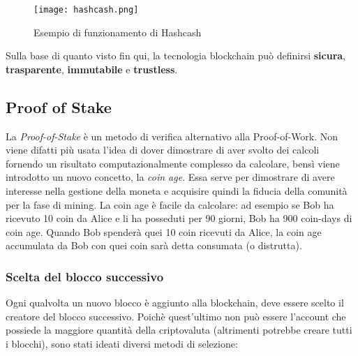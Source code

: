 \begin{figure}[htbp]
  \centering
  \texttt{[image: hashcash.png]}
  \caption{Esempio di funzionamento di Hashcash}
  \label{fig:hashcash}
\end{figure}

Sulla base di quanto visto fin qui, la tecnologia blockchain può definirsi \textbf{sicura}, \textbf{trasparente}, \textbf{immutabile} e \textbf{trustless}.

\subsection{Proof of Stake}
La \textit{Proof-of-Stake} è un metodo di verifica alternativo alla Proof-of-Work. Non viene difatti più usata l'idea di dover dimostrare di aver svolto dei calcoli fornendo un risultato computazionalmente complesso da calcolare, bensì viene introdotto un nuovo concetto, la \textit{coin age}. Essa serve per dimostrare di avere interesse nella gestione della moneta e acquisire quindi la fiducia della comunità per la fase di mining. La coin age è facile da calcolare: ad esempio se Bob ha ricevuto 10 coin da Alice e li ha posseduti per 90 giorni, Bob ha 900 coin-days di coin age. Quando Bob spenderà quei 10 coin ricevuti da Alice, la coin age accumulata da Bob con quei coin sarà detta consumata (o distrutta).

\subsubsection{Scelta del blocco successivo}
Ogni qualvolta un nuovo blocco è aggiunto alla blockchain, deve essere scelto il creatore del blocco successivo. Poichè quest'ultimo non può essere l'account che possiede la maggiore quantità della criptovaluta (altrimenti potrebbe creare tutti i blocchi), sono stati ideati diversi metodi di selezione:

